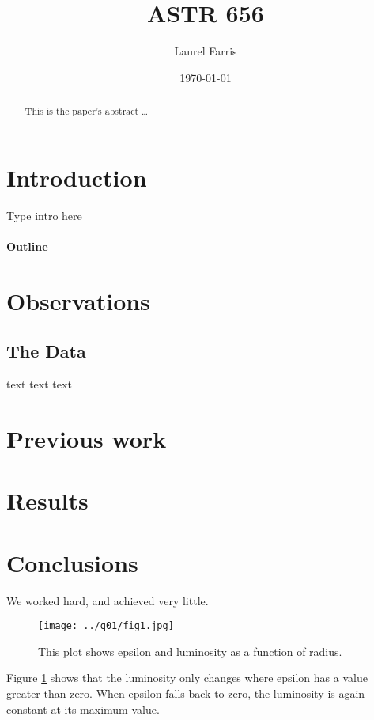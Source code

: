 \documentclass[12pt]{article}
\title{ASTR 656}
\author{Laurel Farris}
\date{\today}
\begin{document}

\maketitle

\begin{abstract}
This is the paper's abstract \ldots  %
\end{abstract}

\section{Introduction}
Type intro here
\paragraph{Outline}  %
\section{Observations}
  \subsection{The Data}
  text text text
\section{Previous work}\label{previous work}
\section{Results}\label{results}
\section{Conclusions}\label{conclusions}
We worked hard, and achieved very little.





\begin{figure}[h]   %
\centering
\texttt{[image: ../q01/fig1.jpg]}
\caption{This plot shows epsilon and luminosity as a function of radius.}
\label{fig1}
\end{figure}

Figure \ref{fig1}  shows that the luminosity only changes where epsilon has a value
greater than zero. When epsilon falls back to zero, the luminosity is again
constant at its maximum value.
\end{document}
